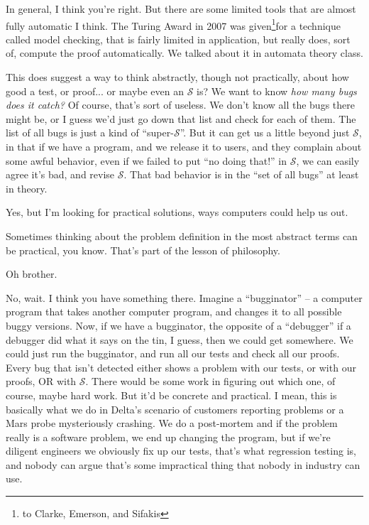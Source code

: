 \documentclass[sigplan]{acmart}
\begin{document}
   In general, I think you're right. But
there are some limited tools that are almost fully automatic I think.
The Turing Award in 2007 was given\footnote{to Clarke, Emerson, and Sifakis}for a technique called model
checking, that is fairly limited in application, but really does, sort of,
compute the proof automatically.  We talked about it in automata
theory class.

  This does suggest a way to think
abstractly, though not practically, about how good a test, or proof...
or maybe even an $\mathcal{S}$ is?  We want to know \emph{how many bugs does
  it catch?}  Of course, that's sort of useless.  We don't know all
the bugs there might be, or I guess we'd just go down that list and
check for each of them.  The list of all bugs is just a kind of ``super-$\mathcal{S}$''.  But it can get us a little beyond just
$\mathcal{S}$, in that if we have a program, and we release it to
users, and they complain about some awful behavior, even if we failed
to put ``no doing that!'' in $\mathcal{S}$, we can easily agree it's
bad, and revise $\mathcal{S}$.  That bad behavior is in the ``set of
all bugs'' at least in theory.

  Yes, but I'm looking for practical
solutions, ways computers could help us out.

  Sometimes thinking about the problem
definition in the most abstract terms can be practical, you know.
That's part of the lesson of philosophy.

  Oh brother.

  No, wait.  I think you have something
there.  Imagine a ``bugginator'' -- a computer program that takes
another computer program, and changes it to all possible buggy
versions.  Now, if we have a bugginator, the opposite of a
``debugger'' if a debugger did what it says on the tin, I guess, then
we could get somewhere.  We could just run the bugginator, and run all
our tests and check all our proofs.  Every bug that isn't detected
either shows a problem with our tests, or with our proofs, OR with
$\mathcal{S}$.  There would be some work in figuring out which one, of
course, maybe hard work.  But it'd be concrete and practical.  I mean,
this is basically what we do in Delta's scenario of customers
reporting problems or a Mars probe mysteriously crashing.  We do a
post-mortem and if the problem really is a software problem, we end up
changing the program, but if we're diligent engineers we obviously fix
up our tests, that's what regression testing is, and nobody can argue
that's some impractical thing that nobody in industry can use.
\end{document}
